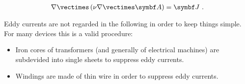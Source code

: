 \begin{gather}
  \label{eq:5}
  \nabla\vectimes\left(\nu\nabla\vectimes\vect{A}\right)=\vect{J}\text{~.}
\end{gather}
\par Eddy currents are not regarded in the following in order to keep
things simple.  For many devices this is a valid procedure:
\begin{itemize}
\item Iron cores of transformers (and generally of electrical
  machines) are subdevided into single sheets to suppress eddy currents.
\item Windings are made of thin wire in order to suppress eddy currents.
\end{itemize}

